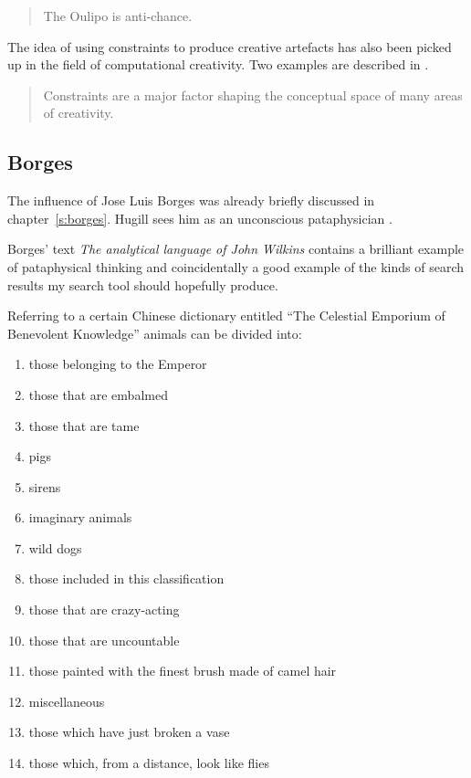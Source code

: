 \begin{quotation}
  The Oulipo is anti-chance. 
\end{quotation}

\spirals

The idea of using constraints to produce creative artefacts has also been picked up in the field of computational creativity. Two examples are described in \autocite{Liapis2013,Toivanen2013}.

\begin{quotation}
  Constraints are a major factor shaping the conceptual space of many areas of creativity. 
\end{quotation}


\subsection{Borges}

The influence of Jose Luis Borges was already briefly discussed in chapter~\ref{s:borges}. Hugill sees him as an unconscious pataphysician \autocite*{Hugill2012}.

Borges' text \textit{The analytical language of John Wilkins} \autocite*{Borges2000} contains a brilliant example of pataphysical thinking and coincidentally a good example of the kinds of search results my search tool should hopefully produce.

Referring to a certain Chinese dictionary entitled ``The Celestial Emporium of Benevolent Knowledge'' animals can be divided into:

\begin{enumerate}
  \item	those belonging to the Emperor
  \item	those that are embalmed
  \item	those that are tame
  \item	pigs
  \item	sirens
  \item	imaginary animals
  \item	wild dogs
  \item	those included in this classification
  \item	those that are crazy-acting
  \item	those that are uncountable
  \item	those painted with the finest brush made of camel hair
  \item	miscellaneous
  \item	those which have just broken a vase
  \item	those which, from a distance, look like flies
\end{enumerate}


